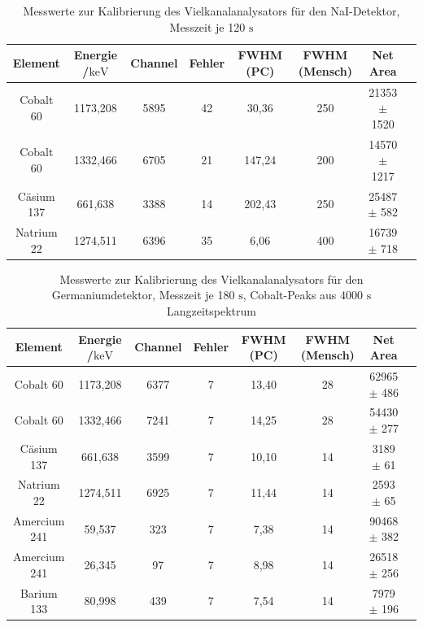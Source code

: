 \documentclass[
	parskip=half,10pt,
	numbers= noenddot, %
	toc=flat, %
	oneside,
	twocolumn,
	]{scrartcl}
\begin{document}
\begin{appendix}

\begin{table}
\begin{small}
\centering
\begin{tabular}{cccccccc}
Element & Energie /$\si{\kilo \electronvolt}$& Channel & Fehler & FWHM (PC) & FWHM (Mensch) & Net Area \\
\hline
Cobalt 60  & 1173,208 & 5895 & 42 & 30,36 & 250 & 21353 $\pm$ 1520 \\
Cobalt 60  & 1332,466 & 6705 & 21 & 147,24 & 200 & 14570 $\pm$ 1217 \\
Cäsium 137 &  661,638 & 3388 & 14 & 202,43 & 250 & 25487 $\pm$ 582 \\
Natrium 22 & 1274,511 & 6396 & 35 & 6,06 & 400 & 16739 $\pm$ 718 \\
\end{tabular}
\caption{Messwerte zur Kalibrierung des Vielkanalanalysators für den NaI-Detektor, Messzeit je 120 $\si{\second}$}
\label{tab:kalib_NaI}

\end{small}
\end{table}

\begin{table}
\begin{small}
\centering
\begin{tabular}{cccccccc}
Element & Energie /$\si{\kilo \electronvolt}$& Channel & Fehler & FWHM (PC) & FWHM (Mensch) & Net Area \\
\hline
Cobalt 60    & 1173,208 & 6377 & 7 & 13,40 & 28 & 62965 $\pm$ 486 \\
Cobalt 60    & 1332,466 & 7241 & 7 & 14,25 & 28 & 54430 $\pm$ 277 \\
Cäsium 137   &  661,638 & 3599 & 7 & 10,10 & 14 &  3189 $\pm$  61 \\
Natrium 22   & 1274,511 & 6925 & 7 & 11,44 & 14 &  2593 $\pm$  65 \\
Amercium 241 &   59,537 &  323 & 7 &  7,38 & 14 & 90468 $\pm$ 382 \\
Amercium 241 &   26,345 &   97 & 7 &  8,98 & 14 & 26518 $\pm$ 256 \\
Barium 133   &   80,998 &  439 & 7 &  7,54 & 14 &  7979 $\pm$ 196
\end{tabular}
\caption{Messwerte zur Kalibrierung des Vielkanalanalysators für den Germaniumdetektor, Messzeit je 180 $\si{\second}$, Cobalt-Peaks aus 4000 $\si{\second}$ 
Langzeitspektrum}
\label{tab:Kalib_Ge}
\end{small}
\end{table}



\end{appendix}
\end{document}
